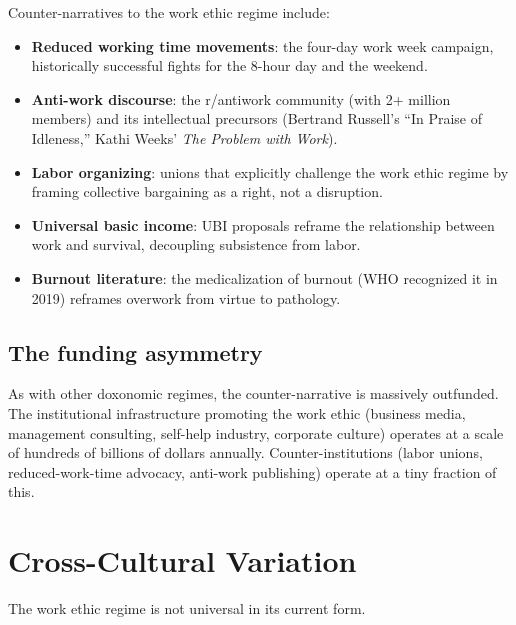 Counter-narratives to the work ethic regime include:
\begin{itemize}[nosep]
  \item \textbf{Reduced working time movements}: the four-day work week campaign, historically successful fights for the 8-hour day and the weekend.
  \item \textbf{Anti-work discourse}: the r/antiwork community (with 2+ million members) and its intellectual precursors (Bertrand Russell's ``In Praise of Idleness,'' Kathi Weeks' \emph{The Problem with Work}).
  \item \textbf{Labor organizing}: unions that explicitly challenge the work ethic regime by framing collective bargaining as a right, not a disruption.
  \item \textbf{Universal basic income}: UBI proposals reframe the relationship between work and survival, decoupling subsistence from labor.
  \item \textbf{Burnout literature}: the medicalization of burnout (WHO recognized it in 2019) reframes overwork from virtue to pathology.
\end{itemize}

\subsection{The funding asymmetry}

As with other doxonomic regimes, the counter-narrative is massively outfunded.
The institutional infrastructure promoting the work ethic (business media, management consulting, self-help industry, corporate culture) operates at a scale of hundreds of billions of dollars annually.
Counter-institutions (labor unions, reduced-work-time advocacy, anti-work publishing) operate at a tiny fraction of this.

\section{Cross-Cultural Variation}
\label{sec:ch26-cross-cultural}

The work ethic regime is not universal in its current form.


